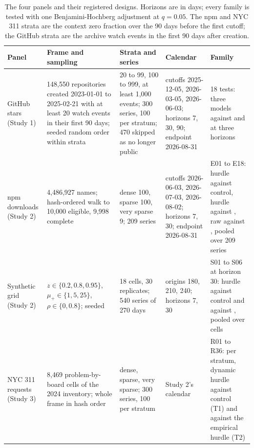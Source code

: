 \begin{table}[t]
\centering\footnotesize\setlength{\tabcolsep}{3.5pt}
\caption{The four panels and their registered designs. Horizons are in days; every family is tested with
one Benjamini-Hochberg adjustment at $q = 0.05$. The npm and NYC 311 strata are the context zero fraction
over the 90 days before the first cutoff; the GitHub strata are the archive watch events in the first 90 days
after creation.}
\label{tab:panels}
\begin{tabular}{P{1.9cm}P{3.5cm}P{2.8cm}P{2.8cm}P{3.5cm}}
\toprule
Panel & Frame and sampling & Strata and series & Calendar & Family \\
\midrule
GitHub stars (Study 1) & 148,550 repositories created 2023-01-01 to 2025-02-21 with at least 20 watch events in their first 90 days; seeded random order within strata & 20 to 99, 100 to 999, at least 1,000 events; 300 series, 100 per stratum; 470 skipped as no longer public & cutoffs 2025-12-05, 2026-03-05, 2026-06-03; horizons 7, 30, 90; endpoint 2026-08-31 & 18 tests: three models against \lm{} and \aets{} at three horizons \\
npm downloads (Study 2) & 4,486,927 names; hash-ordered walk to 10,000 eligible, 9,998 complete & dense 100, sparse 100, very sparse 9; 209 series & cutoffs 2026-06-03, 2026-07-03, 2026-08-02; horizons 7, 30; endpoint 2026-08-31 & E01 to E18: hurdle against control, hurdle against \hc{}, raw against \lm{}, pooled over 209 series \\
Synthetic grid (Study 2) & $z \in \{0.2, 0.8, 0.95\}$, $\mu_{+} \in \{1, 5, 25\}$, $\rho \in \{0, 0.8\}$; seeded & 18 cells, 30 replicates; 540 series of 270 days & origins 180, 210, 240; horizons 7, 30 & S01 to S06 at horizon 30: hurdle against control and against \hc{}, pooled over cells \\
NYC 311 requests (Study 3) & 8,469 problem-by-board cells of the 2024 inventory; whole frame in hash order & dense, sparse, very sparse; 300 series, 100 per stratum & Study 2's calendar & R01 to R36: per stratum, dynamic hurdle against control (T1) and against the empirical hurdle (T2) \\
\bottomrule
\end{tabular}
\end{table}

